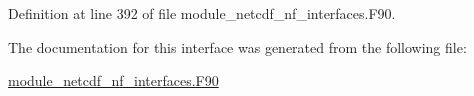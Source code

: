 Definition at line 392 of file module\+\_\+netcdf\+\_\+nf\+\_\+interfaces.\+F90.



The documentation for this interface was generated from the following file\+:\begin{DoxyCompactItemize}
\item 
\hyperlink{module__netcdf__nf__interfaces_8F90}{module\+\_\+netcdf\+\_\+nf\+\_\+interfaces.\+F90}\end{DoxyCompactItemize}
